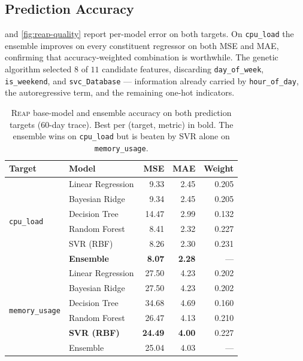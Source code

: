 \documentclass{svproc}
\newcommand{\reap}{\textsc{Reap}}
\begin{document}
\subsection{Prediction Accuracy}\label{sec:pred-perf}
 and \cref{fig:reap-quality} report per-model error on
both targets. On \texttt{cpu\_load} the ensemble improves on every
constituent regressor on both MSE and MAE, confirming that
accuracy-weighted combination is worthwhile. The genetic algorithm
selected $8$ of $11$ candidate features, discarding
\texttt{day\_of\_week}, \texttt{is\_weekend}, and
\texttt{svc\_Database} --- information already carried by
\texttt{hour\_of\_day}, the autoregressive term, and the remaining
one-hot indicators.

\begin{table}[!htbp]
\centering
\caption{\reap{} base-model and ensemble accuracy on both prediction
targets ($60$-day trace). Best per (target, metric) in bold. The
ensemble wins on \texttt{cpu\_load} but is beaten by SVR alone on
\texttt{memory\_usage}.}
\label{tab:reap}
\footnotesize
\setlength{\tabcolsep}{5pt}
\begin{tabular}{l l r r r}
\toprule
Target & Model & MSE & MAE & Weight \\
\midrule
\multirow{6}{*}{\texttt{cpu\_load}}
 & Linear Regression & 9.33  & 2.45 & 0.205 \\
 & Bayesian Ridge    & 9.34  & 2.45 & 0.205 \\
 & Decision Tree     & 14.47 & 2.99 & 0.132 \\
 & Random Forest     & 8.41  & 2.32 & 0.227 \\
 & SVR (RBF)         & 8.26  & 2.30 & 0.231 \\
 & \textbf{Ensemble} & \textbf{8.07} & \textbf{2.28} & --- \\
\midrule
\multirow{6}{*}{\texttt{memory\_usage}}
 & Linear Regression & 27.50 & 4.23 & 0.202 \\
 & Bayesian Ridge    & 27.50 & 4.23 & 0.202 \\
 & Decision Tree     & 34.68 & 4.69 & 0.160 \\
 & Random Forest     & 26.47 & 4.13 & 0.210 \\
 & \textbf{SVR (RBF)} & \textbf{24.49} & \textbf{4.00} & 0.227 \\
 & Ensemble          & 25.04 & 4.03 & --- \\
\bottomrule
\end{tabular}
\end{table}
\end{document}
